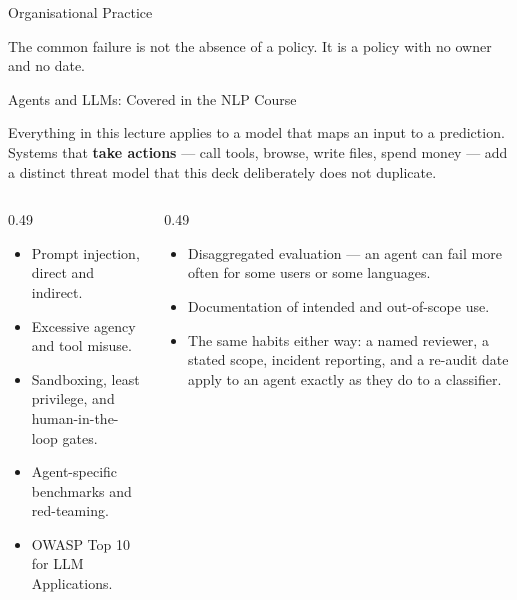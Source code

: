 \begin{frame}{Organisational Practice}
    \vspace{0.8em}
    \begin{block}{}
        \centering
        \small The common failure is not the absence of a policy. It is a policy with no owner and
        no date.
    \end{block}
\end{frame}

\begin{frame}{Agents and LLMs: Covered in the NLP Course}

    Everything in this lecture applies to a model that maps an input to a prediction. Systems that
    \textbf{take actions} --- call tools, browse, write files, spend money --- add a distinct threat
    model that this deck deliberately does not duplicate.

    \vspace{0.9em}

    \begin{columns}[T]
        \begin{column}{0.49\textwidth}
            \begin{tcolorbox}[colback=gray!8, colframe=gray!60,
                              title={NLP course: AI Safety for Agents}]
                \scriptsize
                \begin{itemize}
                    \item Prompt injection, direct and indirect.
                    \item Excessive agency and tool misuse.
                    \item Sandboxing, least privilege, and human-in-the-loop gates.
                    \item Agent-specific benchmarks and red-teaming.
                    \item OWASP Top 10 for LLM Applications.
                \end{itemize}
            \end{tcolorbox}
        \end{column}
        \begin{column}{0.49\textwidth}
            \begin{tcolorbox}[colback=raiBlue!5, colframe=raiBlue!60, title=What carries over]
                \scriptsize
                \begin{itemize}
                    \item Disaggregated evaluation --- an agent can fail more often for some users
                          or some languages.
                    \item Documentation of intended and out-of-scope use.
                    \item The same habits either way: a named reviewer, a stated scope, incident
                          reporting, and a re-audit date apply to an agent exactly as they do to a
                          classifier.
                \end{itemize}
            \end{tcolorbox}
        \end{column}
    \end{columns}


\end{frame}
